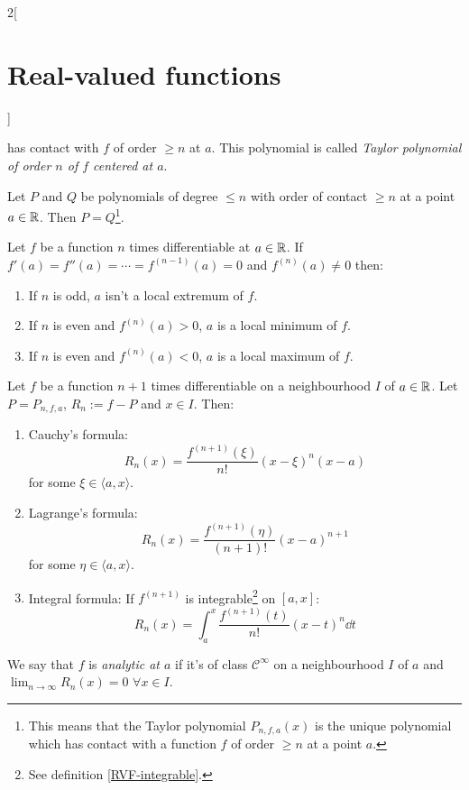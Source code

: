\documentclass[../../../main.tex]{subfiles}
\begin{document}
\begin{multicols}{2}[\section{Real-valued functions}]
\begin{theorem}
        has contact with $f$ of order $\geq n$ at $a$. This polynomial is called \textit{Taylor polynomial of order $n$ of $f$ centered at $a$}.
    \end{theorem}
    \begin{prop}
        Let $P$ and $Q$ be polynomials of degree $\leq n$ with order of contact $\geq n$ at a point $a\in\mathbb{R}$. Then $P=Q$\footnote{This means that the Taylor polynomial $P_{n,f,a}(x)$ is the unique polynomial which has contact with a function $f$ of order $\geq n$ at a point $a$.}.
    \end{prop}
    \begin{theorem}
        Let $f$ be a function $n$ times differentiable at $a\in\mathbb{R}$. If $f'(a)=f''(a)=\cdots=f^{(n-1)}(a)=0$ and $f^{(n)}(a)\ne 0$ then:
        \begin{enumerate}
            \item If $n$ is odd, $a$ isn't a local extremum of $f$.
            \item If $n$ is even and $f^{(n)}(a)>0$, $a$ is a local minimum of $f$.
            \item If $n$ is even and $f^{(n)}(a)<0$, $a$ is a local maximum of $f$.
        \end{enumerate}
    \end{theorem}
    \begin{theorem}
        Let $f$ be a function $n+1$ times differentiable on a neighbourhood $I$ of $a\in\mathbb{R}$. Let $P=P_{n,f,a}$, $R_n:=f-P$ and $x\in I$. Then:
        \begin{enumerate}
            \item Cauchy's formula: $$R_n(x)=\frac{f^{(n+1)}(\xi)}{n!}{(x-\xi)}^n(x-a)$$ for some $\xi\in\langle a,x\rangle$.
            \item Lagrange's formula: $$R_n(x)=\frac{f^{(n+1)}(\eta)}{(n+1)!}{(x-a)}^{n+1}$$ for some $\eta\in\langle a,x\rangle$.
            \item Integral formula: If $f^{(n+1)}$ is integrable\footnote{See definition \ref{RVF-integrable}.} on $[a,x]$: $$R_n(x)=\int_a^x\frac{f^{(n+1)}(t)}{n!}{(x-t)}^n\dd t$$
        \end{enumerate}
    \end{theorem}
    \begin{definition}
        We say that $f$ is \textit{analytic at $a$} if it's of class $\mathcal{C}^\infty$ on a neighbourhood $I$ of $a$ and $\displaystyle\lim_{n\to\infty}R_n(x)=0$  $\forall x\in I$.
    \end{definition}
    \begin{center}

\end{center}
\end{multicols}
\end{document}
